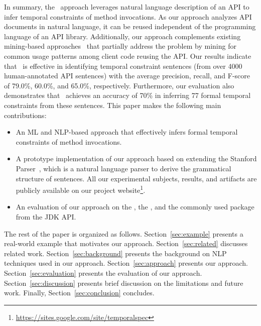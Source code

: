 In summary, the \tool\ approach leverages natural language description of an API to infer temporal constraints of method invocations.
As our approach analyzes API documents in natural language, it can be reused independent of the programming language of an API library.
Additionally, our approach complements existing mining-based approaches~\cite{buse2012synthesizing, thummalapenta07parseweb, Wang:2013:MSR, Zhong:2009:MMR} that partially address the problem by mining for common usage patterns among client code reusing the API.
Our results indicate that \tool\ is effective in identifying temporal
constraint sentences (from over
4000 human-annotated API sentences) with the average precision, recall, and F-score
of 79.0\%, 60.0\%, and 65.0\%, respectively.
Furthermore, our evaluation also demonstrates that \tool\ achieves an accuracy of 70\% in inferring 77 formal temporal constraints from these sentences.
This paper makes the following main contributions:


\begin{itemize}
	\item An ML and NLP-based approach that effectively infers formal temporal constraints of method invocations. 
	\item A prototype implementation of our approach based on extending the Stanford Parser~\cite{Klein03}, which is a natural language parser to derive the grammatical structure of sentences.
	All our experimental subjects, results, and artifacts are publicly available on our project website\footnote{\url{https://sites.google.com/site/temporalspec}}. 
	\item An evaluation of our approach on the \amazonAPI, the \paypalAPI, and the commonly used package  from the JDK API. 
\end{itemize}


The rest of the paper is organized as follows.
Section~\ref{sec:example} presents a real-world example that motivates our approach.
Section~\ref{sec:related} discusses related work.
Section~\ref{sec:background} presents the  background on NLP techniques used in our approach.
Section~\ref{sec:approach} presents our approach.
Section~\ref{sec:evaluation} presents the evaluation of our approach.
Section~\ref{sec:discussion} presents brief discussion on the limitations and future work.
Finally, Section~\ref{sec:conclusion} concludes.

